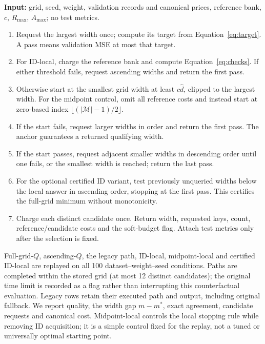\medskip\noindent\begin{minipage}{\linewidth}
\begin{Algorithm}
\label{alg:replay}\normalfont\small\leavevmode\par\noindent
\textbf{Input:} grid, seed, weight, validation records and canonical prices,
reference bank, $c$, $R_{\max}$, $A_{\max}$; no test metrics.
\begin{enumerate}
\item Request the largest width once; compute its target from
Equation~\ref{eq:target}. A pass means validation MSE at most that target.
\item For ID-local, charge the reference bank and compute Equation~\ref{eq:checks}.
If either threshold fails, request ascending widths and return the first pass.
\item Otherwise start at the smallest grid width at least $c\hat d$,
clipped to the largest width. For the midpoint control, omit all reference
costs and instead start at zero-based index $\lfloor(|\mathcal M|-1)/2\rfloor$.
\item If the start fails, request larger widths in order and return the
first pass. The anchor guarantees a returned qualifying width.
\item If the start passes, request adjacent smaller widths in descending
order until one fails, or the smallest width is reached; return the last pass.
\item For the optional certified ID variant, test previously unqueried
widths below the local answer in ascending order, stopping at the first
pass. This certifies the full-grid minimum without monotonicity.
\item Charge each distinct candidate once. Return width, requested keys,
count, reference/candidate costs and the soft-budget flag. Attach test
metrics only after the selection is fixed.
\end{enumerate}
\end{Algorithm}
\end{minipage}\medskip

Full-grid-$Q$, ascending-$Q$, the legacy path, ID-local, midpoint-local
and certified ID-local are replayed on all 100 dataset--weight--seed
conditions. Paths are completed within the stored grid (at most 12
distinct candidates); the original time limit is recorded as a flag
rather than interrupting this counterfactual evaluation. Legacy rows
retain their executed path and output, including original fallback.
We report quality, the width gap $m-m^*$, exact agreement, candidate
requests and canonical cost. Midpoint-local controls the local stopping
rule while removing ID acquisition; it is a simple control fixed for
the replay, not a tuned or universally optimal starting point.

